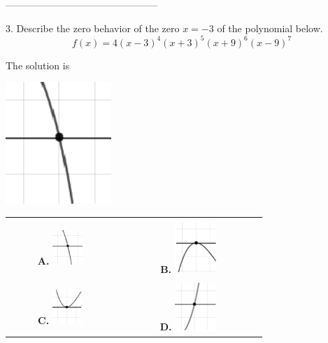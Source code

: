 \documentclass{extbook}[14pt]
\begin{document}
-----------------------------------------------

3. Describe the zero behavior of the zero $x = -3$ of the polynomial below.
\[ f(x) = 4(x - 3)^{4}(x + 3)^{5}(x + 9)^{6}(x - 9)^{7} \] 

 
 The solution is  
 \begin{center} \includegraphics[width=0.3\textwidth]{../Figures/polyZeroBehaviorAA.png} \end{center}\begin{tabular}{|c|c|} 
\hline 
 & \tabularnewline 
 \textbf{A.} \includegraphics[width=0.3\textwidth]{../Figures/polyZeroBehaviorAA.png} & \textbf{B.} \includegraphics[width=0.3\textwidth]{../Figures/polyZeroBehaviorBA.png} \tabularnewline 
\hline 
 & \tabularnewline 
 \textbf{C.} \includegraphics[width=0.3\textwidth]{../Figures/polyZeroBehaviorCA.png} & \textbf{D.} \includegraphics[width=0.3\textwidth]{../Figures/polyZeroBehaviorDA.png} \tabularnewline 

\end{tabular}
\end{document}
